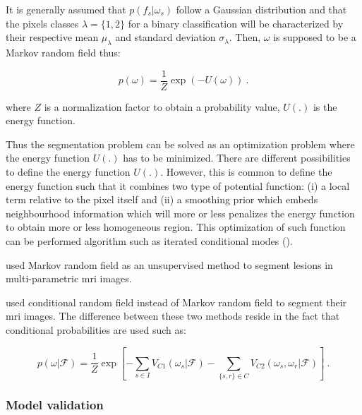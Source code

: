 \begin{enumerate}[leftmargin=*]
It is generally assumed that $p(f_s | \omega_s)$ follow a Gaussian distribution and that the pixels classes $\lambda = \{1,2\}$ for a binary classification will be characterized by their respective mean $\mu_{\lambda}$ and standard deviation $\sigma_{\lambda}$. Then, $\omega$ is supposed to be a Markov random field thus:

\begin{equation}
	p(\omega) =  \frac{1}{Z} \exp\left( -U(\omega) \right)  \ .
	\label{eq:mrf2}
\end{equation}

\noindent where $Z$ is a normalization factor to obtain a probability value, $U(.)$ is the energy function.

Thus the segmentation problem can be solved as an optimization problem where the energy function $U(.)$ has to be minimized. There are different possibilities to define the energy function $U(.)$. However, this is common to define the energy function such that it combines two type of potential function: (i) a local term relative to the pixel itself and (ii) a smoothing prior which embeds neighbourhood information which will more or less penalizes the energy function to obtain more or less homogeneous region. This optimization of such function can be performed algorithm such as iterated conditional modes (\cite{Kato2001}).

\cite{Liu2009,Ozer2010} used Markov random field as an unsupervised method to segment lesions in multi-parametric \ac{mri} images.

\cite{Artan2009,Artan2010} used conditional random field instead of Markov random field to segment their \ac{mri} images. The difference between these two methods reside in the fact that conditional probabilities are used such as:

\begin{equation}
	p(\omega|\mathcal{F}) =  \frac{1}{Z} \exp \left[ - \sum_{s \in I} V_{C1}(\omega_s|\mathcal{F}) - \sum_{\{s,r\} \in C } V_{C2} (\omega_s,\omega_r|\mathcal{F})  \right] \ .
\label{eq:crf}
\end{equation}

\end{enumerate}

\subsubsection{Model validation}


